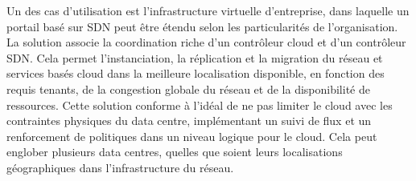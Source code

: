 Un des cas d'utilisation est l'infrastructure virtuelle d'entreprise, dans laquelle un portail basé sur SDN peut être étendu selon les particularités de l'organisation. La solution associe la coordination riche d'un contrôleur cloud et d'un contrôleur SDN. Cela permet l'instanciation, la réplication et la migration du réseau et services basés cloud dans la meilleure localisation disponible, en fonction des requis tenants, de la congestion globale du réseau et de la disponibilité de ressources. Cette solution conforme à l'idéal de ne pas limiter le cloud avec les contraintes physiques du data centre, implémentant un suivi de flux et un renforcement de politiques dans un niveau logique pour le cloud. Cela peut englober plusieurs data centres, quelles que soient leurs localisations géographiques dans l'infrastructure du réseau.





